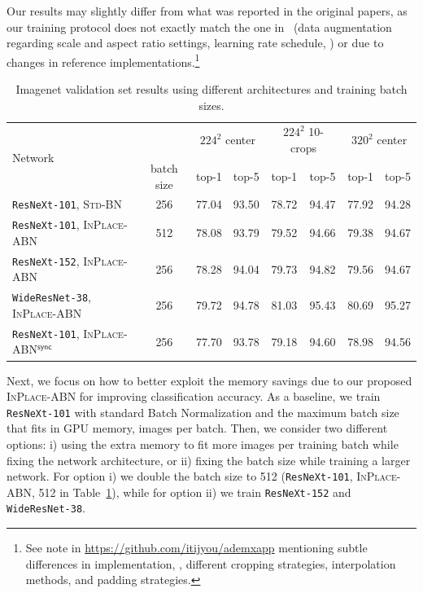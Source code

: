 \documentclass[10pt,twocolumn,letterpaper]{article}
\newcommand{\bnStd}{\textsc{Std-BN}\xspace}
\newcommand{\bnInplace}{\textsc{InPlace-ABN}\xspace}
\newcommand{\bnInplaceSync}{\textsc{InPlace-ABN$^{\mathsf{sync}}$}\xspace}
\begin{document}
Our results may slightly differ from what was reported in the original papers, as our training protocol does not exactly match the one in~\cite{Xie2016} (\eg data augmentation regarding scale and aspect ratio settings, learning rate schedule, \etc) or due to changes in reference implementations.\footnote{See note in \url{https://github.com/itijyou/ademxapp} mentioning subtle differences in implementation, \eg, different cropping strategies, interpolation methods, and padding strategies.}
\begin{table}[t]
\centering
\small
\begin{tabular}{lccccccc}
  \toprule
    \multirow{2}{*}{Network} & & \multicolumn{2}{c}{$224^2$ center} & \multicolumn{2}{c}{$224^2$ 10-crops} & \multicolumn{2}{c}{$320^2$ center} \\
  \cmidrule{3-8}
    & batch size & top-1 & top-5 & top-1 & top-5 & top-1 & top-5 \\
  \midrule
    \texttt{ResNeXt-101}, \bnStd & 256 & 77.04 & 93.50 & 78.72 & 94.47 & 77.92 & 94.28 \\
  \midrule
    \texttt{ResNeXt-101}, \bnInplace & 512 & 78.08 & 93.79 & 79.52 & 94.66 & 79.38 & 94.67 \\
    \texttt{ResNeXt-152}, \bnInplace & 256 & 78.28 & 94.04 & 79.73 & 94.82 & 79.56 & 94.67 \\
    \texttt{WideResNet-38}, \bnInplace & 256 & 79.72 & 94.78 & 81.03 & 95.43 & 80.69 & 95.27 \\
  \midrule
    \texttt{ResNeXt-101}, \bnInplaceSync & 256 & 77.70 & 93.78 & 79.18 & 94.60 & 78.98 & 94.56 \\
  \bottomrule
\end{tabular}
  \vspace{1em}
  \caption{Imagenet validation set results using different architectures and training batch sizes.}
  \label{tab:imagenet}
\end{table}
Next, we focus on how to better exploit the memory savings due to our proposed \bnInplace for improving classification accuracy.
As a baseline, we train \texttt{ResNeXt-101} with standard Batch Normalization and the maximum batch size that fits in GPU memory,  images per batch.
Then, we consider two different options: i) using the extra memory to fit more images per training batch while fixing the network architecture, or ii) fixing the batch size while training a larger network.
For option i) we double the batch size to 512 (\texttt{ResNeXt-101}, \bnInplace, 512 in Table~\ref{tab:imagenet}), while for option ii) we train \texttt{ResNeXt-152} and \texttt{WideResNet-38}.
\end{document}
